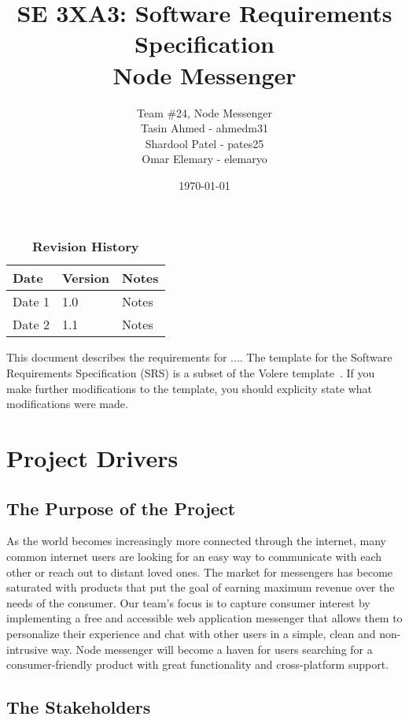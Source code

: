 \documentclass[12pt, titlepage]{article}
\title{SE 3XA3: Software Requirements Specification\\Node Messenger}
\author{Team \#24, Node Messenger
		\\ Tasin Ahmed - ahmedm31
		\\ Shardool Patel - pates25
		\\ Omar Elemary - elemaryo
}
\date{\today}
\begin{document}
    \maketitle

    \tableofcontents
    \listoftables
    \listoffigures

    \begin{table}[bp]
    \caption{\bf Revision History}
    \begin{tabularx}{\textwidth}{p{3cm}p{2cm}X}
    \toprule {\bf Date} & {\bf Version} & {\bf Notes}\\
    \midrule
    Date 1 & 1.0 & Notes\\
    Date 2 & 1.1 & Notes\\
    \bottomrule
    \end{tabularx}
    \end{table}

    \newpage


    This document describes the requirements for ....  The template for the Software
    Requirements Specification (SRS) is a subset of the Volere
    template~\citep{RobertsonAndRobertson2012}.  If you make further modifications
    to the template, you should explicity state what modifications were made.

    \section{Project Drivers}

    	\subsection{The Purpose of the Project}
        As the world becomes increasingly more connected through the internet, many common internet users are looking for an easy way to communicate with each other or reach out to distant loved ones. The market for messengers has become saturated with products that put the goal of earning maximum revenue over the needs of the consumer. Our team’s focus is to capture consumer interest by implementing a free and accessible web application messenger that allows them to personalize their experience and chat with other users in a simple, clean and non-intrusive way. Node messenger will become a haven for users searching for a consumer-friendly product with great functionality and cross-platform support.
    	\subsection{The Stakeholders}
\end{document}
